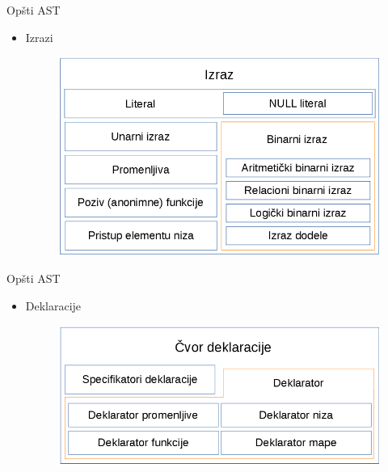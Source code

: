 \documentclass{beamer}
\begin{document}
\begin{frame}{Op\v{s}ti AST}
    \begin{itemize}
        \item Izrazi
        \begin{figure}[h!]
            \centering
            \includegraphics[scale=0.5]{images/expression_nodes.png}
        \end{figure}
    \end{itemize}
\end{frame}

\begin{frame}{Op\v{s}ti AST}
    \begin{itemize}
        \item Deklaracije
        \begin{figure}[h!]
            \centering
            \includegraphics[scale=0.5]{images/declaration_nodes.png}
        \end{figure}
    \end{itemize}
\end{frame}
\end{document}
